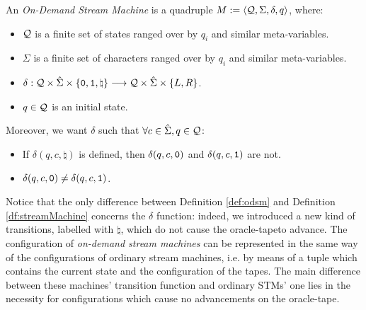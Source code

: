 \begin{defn}
  \label{def:odsm}
An \emph{On-Demand Stream Machine} is a quadruple
$M:= \langle \mathcal{Q},\Sigma, \delta,q\rangle$,
where:
\begin{itemize}
\itemsep0em
\item $\mathcal{Q}$ is a finite set of states ranged over by
$q_i$ and similar meta-variables.
%
\item $\Sigma$ is a finite set of characters ranged over by
$q_i$ and similar meta-variables.
%
\item $\delta:\mathcal{Q} \times \hat{\Sigma} \times
\{\mathtt{0}, \mathtt{1}, \natural\} \longrightarrow \mathcal{Q}
\times \hat{\Sigma} \times \{L,R\}$.
\item $q\in \mathcal{Q}$ is an initial state.
\end{itemize}
\noindent
Moreover, we want $\delta$ such that $\forall c \in \hat{\Sigma}, q \in \mathcal{Q}$:
\begin{itemize}
  \item If
  $\delta(q, c, \natural)$ is defined, then $\delta(q, c, \mathtt{0})$ and $\delta(q, c, \mathtt{1})$
  are not.
  \item $\delta(q, c, \mathtt{0})\neq \delta(q, c, \mathtt{1})$.
\end{itemize}
\end{defn}

Notice that the only difference between Definition \ref{def:odsm} and
Definition \ref{df:streamMachine} concerns the $\delta$ function: indeed, we
introduced a new kind of transitions, labelled with
$\natural$, which do not cause the oracle-tapeto advance.
%
The configuration of \emph{on-demand stream machines} can be represented in
the same way of the configurations of ordinary stream machines, i.e. by
means of a tuple which contains the current state and the configuration of
the tapes.
%
The main difference between these machines' transition function
and ordinary STMs' one lies in the necessity for configurations
which cause no advancements on the oracle-tape.

